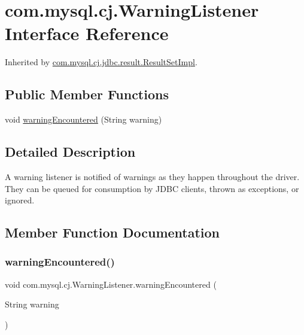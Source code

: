 \hypertarget{interfacecom_1_1mysql_1_1cj_1_1_warning_listener}{}\section{com.\+mysql.\+cj.\+Warning\+Listener Interface Reference}
\label{interfacecom_1_1mysql_1_1cj_1_1_warning_listener}


Inherited by \mbox{\hyperlink{classcom_1_1mysql_1_1cj_1_1jdbc_1_1result_1_1_result_set_impl}{com.\+mysql.\+cj.\+jdbc.\+result.\+Result\+Set\+Impl}}.

\subsection*{Public Member Functions}
\begin{DoxyCompactItemize}
\item 
void \mbox{\hyperlink{interfacecom_1_1mysql_1_1cj_1_1_warning_listener_a28ab01ad54f9489d0b720ccf35d5d0bc}{warning\+Encountered}} (String warning)
\end{DoxyCompactItemize}


\subsection{Detailed Description}
A warning listener is notified of warnings as they happen throughout the driver. They can be queued for consumption by J\+D\+BC clients, thrown as exceptions, or ignored. 

\subsection{Member Function Documentation}
\mbox{\label{interfacecom_1_1mysql_1_1cj_1_1_warning_listener_a28ab01ad54f9489d0b720ccf35d5d0bc}} 
\subsubsection{\texorpdfstring{warning\+Encountered()}{warningEncountered()}}
{\footnotesize\ttfamily void com.\+mysql.\+cj.\+Warning\+Listener.\+warning\+Encountered (\begin{DoxyParamCaption}\item[{String}]{warning }\end{DoxyParamCaption})}



